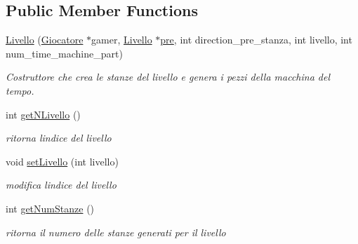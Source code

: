 \subsection*{Public Member Functions}
\begin{DoxyCompactItemize}
\item 
\hyperlink{classLivello_ac1d34208a12139365a7eb749a5668f8f}{Livello} (\hyperlink{classGiocatore}{Giocatore} $\ast$gamer, \hyperlink{classLivello}{Livello} $\ast$\hyperlink{classLivello_a05397a3b59545c76f627de49f23d70a8}{pre}, int direction\+\_\+pre\+\_\+stanza, int livello, int num\+\_\+time\+\_\+machine\+\_\+part)
\begin{DoxyCompactList}\small\item\em Costruttore che crea le stanze del livello e genera i pezzi della macchina del tempo. \end{DoxyCompactList}\item 
\hypertarget{classLivello_ac68f1cff83b129ca15659d114d01019e}{}int \hyperlink{classLivello_ac68f1cff83b129ca15659d114d01019e}{get\+N\+Livello} ()\label{classLivello_ac68f1cff83b129ca15659d114d01019e}

\begin{DoxyCompactList}\small\item\em ritorna l\textquotesingle{}indice del livello \end{DoxyCompactList}\item 
void \hyperlink{classLivello_a4b3938ca43f2b73c7d326077f737147a}{set\+Livello} (int livello)
\begin{DoxyCompactList}\small\item\em modifica l\textquotesingle{}indice del livello \end{DoxyCompactList}\item 
\hypertarget{classLivello_a6c9fa17a5a53d8d7f5ee588fb262e204}{}int \hyperlink{classLivello_a6c9fa17a5a53d8d7f5ee588fb262e204}{get\+Num\+Stanze} ()\label{classLivello_a6c9fa17a5a53d8d7f5ee588fb262e204}

\begin{DoxyCompactList}\small\item\em ritorna il numero delle stanze generati per il livello \end{DoxyCompactList}\end{DoxyCompactItemize}
